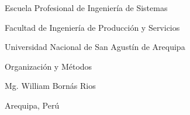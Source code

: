 \begin{titlepage}
  \singlespacing
  \centering
  \vspace*{3\baselineskip}
  {\bfseries \titulo \par}
  \vspace{2\baselineskip}
  \autor\par
  \correo\par
  \vspace{1\baselineskip}
  Escuela Profesional de Ingeniería de Sistemas\par
  Facultad de Ingeniería de Producción y Servicios\par
  Universidad Nacional de San Agustín de Arequipa\par
  \vspace{1\baselineskip}
  Organización y Métodos\par
  Mg. William Bornás Rios\par
  \vspace{1\baselineskip}
  \par
  Arequipa, Perú
\end{titlepage}